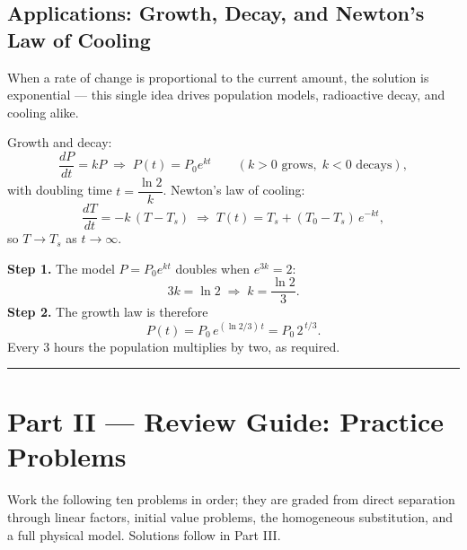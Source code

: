 \subsection{Applications: Growth, Decay, and Newton's Law of Cooling}

When a rate of change is proportional to the current amount, the solution is
exponential --- this single idea drives population models, radioactive decay,
and cooling alike.

\begin{formulabox}
Growth and decay:
\[
    \frac{dP}{dt} = kP \;\Longrightarrow\; P(t) = P_{0}e^{kt}
    \qquad (k>0 \text{ grows},\; k<0 \text{ decays}),
\]
with doubling time $t = \dfrac{\ln 2}{k}$. Newton's law of cooling:
\[
    \frac{dT}{dt} = -k\,(T - T_{s}) \;\Longrightarrow\;
    T(t) = T_{s} + (T_{0} - T_{s})\,e^{-kt},
\]
so $T \to T_{s}$ as $t \to \infty$.
\end{formulabox}

\begin{examplebox}
\textbf{Step 1.} The model $P = P_{0}e^{kt}$ doubles when $e^{3k} = 2$:
\[ 3k = \ln 2 \;\Longrightarrow\; k = \frac{\ln 2}{3}. \]
\textbf{Step 2.} The growth law is therefore
\[ P(t) = P_{0}\,e^{(\ln 2 / 3)\,t} = P_{0}\,2^{\,t/3}. \]
Every $3$ hours the population multiplies by two, as required.
\end{examplebox}

\vspace{0.4em}
\hrule
\vspace{0.6em}

\clearpage
{}
{}
\section*{Part II --- Review Guide: Practice Problems}

Work the following ten problems in order; they are graded from direct
separation through linear factors, initial value problems, the homogeneous
substitution, and a full physical model. Solutions follow in Part III.

